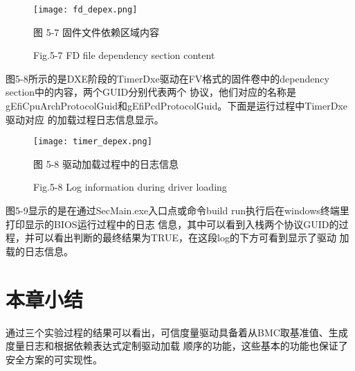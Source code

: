 \begin{figure}[H]
    \vspace{0cm}   
    \setlength{\abovecaptionskip}{0.3cm}
	\centering
    \texttt{[image: fd\_depex.png]}
    \caption*{图 5-7 固件文件依赖区域内容}
    \setlength{\belowcaptionskip}{-0.7cm}
    \caption*{Fig.5-7 FD file dependency section content}
\end{figure}

图5-8所示的是DXE阶段的TimerDxe驱动在FV格式的固件卷中的dependency section中的内容，两个GUID分别代表两个
协议，他们对应的名称是gEfiCpuArchProtocolGuid和gEfiPcdProtocolGuid。下面是运行过程中TimerDxe驱动对应
的加载过程日志信息显示。

\begin{figure}[H]
    \vspace{0cm}   
    \setlength{\abovecaptionskip}{0.3cm}
	\centering
    \texttt{[image: timer\_depex.png]}
    \caption*{图 5-8 驱动加载过程中的日志信息}
    \setlength{\belowcaptionskip}{-0.7cm}
    \caption*{Fig.5-8 Log information during driver loading}
\end{figure}

图5-9显示的是在通过SecMain.exe入口点或命令build run执行后在windows终端里打印显示的BIOS运行过程中的日志
信息，其中可以看到入栈两个协议GUID的过程，并可以看出判断的最终结果为TRUE，在这段log的下方可看到显示了驱动
加载的日志信息。

%
%
\section{本章小结}
通过三个实验过程的结果可以看出，可信度量驱动具备着从BMC取基准值、生成度量日志和根据依赖表达式定制驱动加载
顺序的功能，这些基本的功能也保证了安全方案的可实现性。

\bjutclearpage
